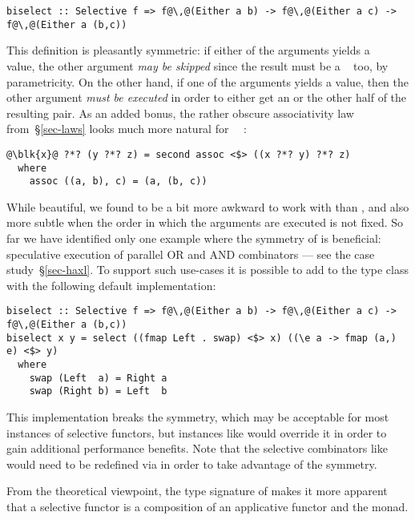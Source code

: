 \vspace{1mm}
\begin{verbatim}
biselect :: Selective f => f@\,@(Either a b) -> f@\,@(Either a c) -> f@\,@(Either a (b,c))
\end{verbatim}
\vspace{1mm}

\noindent
This definition is pleasantly symmetric: if either of the arguments yields a
~ value, the other argument \emph{may be skipped} since the
result must be a ~ too, by parametricity. On the other hand, if
one of the arguments yields a  value, then the other argument
\emph{must be executed} in order to either get an  or the other half of
the resulting pair. As an added bonus, the rather obscure associativity law
from~\S\ref{sec-laws} looks much more natural for
~\hs{=}~:

\vspace{1mm}
\begin{verbatim}
@\blk{x}@ ?*? (y ?*? z) = second assoc <$> ((x ?*? y) ?*? z)
  where
    assoc ((a, b), c) = (a, (b, c))
\end{verbatim}
\vspace{1mm}

While beautiful, we found  to be a bit more awkward to work with
than , and also more subtle when the order in which the arguments
are executed is not fixed. So far we have identified only one example where the
symmetry of  is beneficial: speculative execution of parallel OR
and AND combinators --- see the \Haxl case study~\S\ref{sec-haxl}. To support
such use-cases it is possible to add  to the  type
class with the following default implementation:

\vspace{1mm}
\begin{verbatim}
biselect :: Selective f => f@\,@(Either a b) -> f@\,@(Either a c) -> f@\,@(Either a (b,c))
biselect x y = select ((fmap Left . swap) <$> x) ((\e a -> fmap (a,) e) <$> y)
  where
    swap (Left  a) = Right a
    swap (Right b) = Left  b
\end{verbatim}
\vspace{1mm}

\noindent
This implementation breaks the symmetry, which may be acceptable for most
instances of selective functors, but instances like  would override it
in order to gain additional performance benefits. Note that the selective
combinators like \hs{<||>} would need to be redefined via  in order
to take advantage of the symmetry.

From the theoretical viewpoint, the type signature of  makes it
more apparent that a selective functor  is a composition of an applicative
functor  and the  monad.


